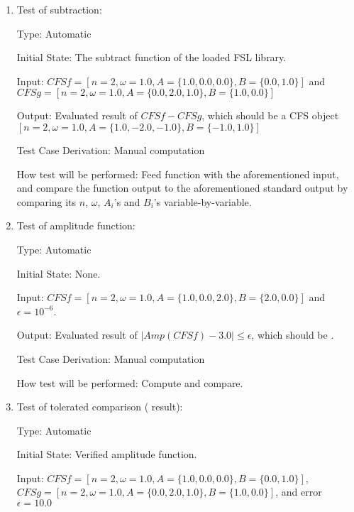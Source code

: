 \documentclass[12pt, titlepage]{article}
\begin{document}
\begin{enumerate}
	
	\item{Test of subtraction: \\}
	
	Type: Automatic
	
	Initial State: The subtract function of the loaded FSL library.
	
	Input: $\mathit{CFSf}=[n=2, \omega=1.0, A=\{1.0, 0.0, 0.0\}, B=\{0.0, 1.0\}]$ and 
	$\mathit{CFSg}=[n=2, \omega=1.0, A=\{0.0, 2.0, 1.0\}, B=\{1.0, 0.0\}]$	 
	
	Output: Evaluated result of $\mathit{CFSf}-\mathit{CFSg}$, which should
        be a CFS object
        $[n=2, \omega=1.0, A=\{1.0, -2.0, -1.0\}, B=\{-1.0, 1.0\}]$
	
	Test Case Derivation: Manual computation 
	
	How test will be performed: Feed function with the aforementioned input,
        and compare the function output to the aforementioned standard output by
        comparing its $n$, $\omega$, $A_i$'s and $B_i$'s variable-by-variable.
	
	\item{Test of amplitude function: \\}					
	
	Type: Automatic
	
	Initial State: None.
	
	Input: $\mathit{CFSf}=[n=2, \omega=1.0, A=\{1.0, 0.0, 2.0\}, B=\{2.0,
        0.0\}]$ and $\epsilon=10^{-6}$.
	
	Output: Evaluated result of
        $|\mathit{Amp}(\mathit{CFSf})-3.0|\leq\epsilon$, which should be
        .
	
	Test Case Derivation: Manual computation
	
	How test will be performed: Compute and compare.
	
	
	\item{Test of tolerated comparison  ( result): \\}
	
	Type: Automatic
	
	Initial State: Verified amplitude function.
	
	Input: $\mathit{CFSf}=[n=2, \omega=1.0, A=\{1.0, 0.0, 0.0\}, B=\{0.0, 1.0\}]$, 
	$\mathit{CFSg}=[n=2, \omega=1.0, A=\{0.0, 2.0, 1.0\}, B=\{1.0, 0.0\}]$, and error $\epsilon=10.0$
	

\end{enumerate}
\end{document}
